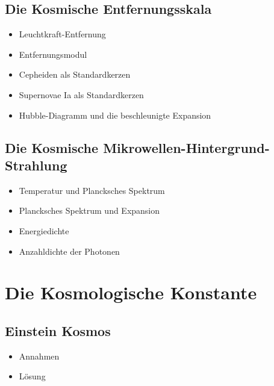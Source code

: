 \documentclass{article}
\begin{document}
\begin{multicols}{2}
    \subsection{Die Kosmische Entfernungsskala} %
    \label{sub:die_kosmische_entfernungsskala}
      \begin{itemize}
        \item Leuchtkraft-Entfernung
        \item Entfernungsmodul
        \item Cepheiden als Standardkerzen
        \item Supernovae Ia als Standardkerzen
        \item Hubble-Diagramm und die beschleunigte Expansion
      \end{itemize}

    \subsection{Die Kosmische Mikrowellen-Hintergrund-Strahlung} %
    \label{sub:die_kosmische_mikrowellen_hintergrund_strahlung}
      \begin{itemize}
        \item Temperatur und Plancksches Spektrum
        \item Plancksches Spektrum und Expansion
        \item Energiedichte
        \item Anzahldichte der Photonen
      \end{itemize}

  \section{Die Kosmologische Konstante} %
  \label{sec:die_kosmologische_konstante}
    \subsection{Einstein Kosmos} %
    \label{sub:einstein_kosmos}
      \begin{itemize}
        \item Annahmen
        \item Lösung
      \end{itemize}


\end{multicols}
\end{document}
